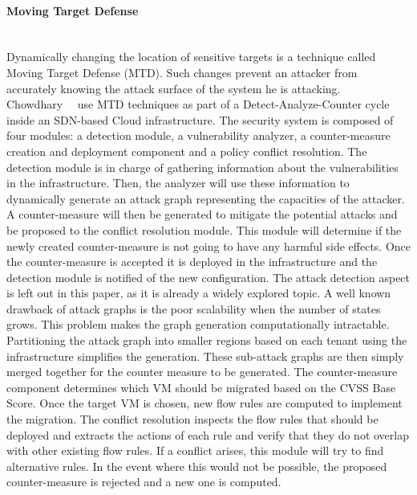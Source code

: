 \paragraph{Moving Target Defense}\textbf{\\}
Dynamically changing the location of sensitive targets is a technique called Moving Target Defense (MTD). Such changes prevent an attacker from accurately knowing the attack surface of the system he is attacking. 
Chowdhary~\etal~\cite{Chowdhary2016} use MTD techniques as part of a Detect-Analyze-Counter cycle inside an SDN-based Cloud infrastructure. 
The security system is composed of four modules: a detection module, a vulnerability analyzer, a counter-measure creation and deployment component and a policy conflict resolution.
The detection module is in charge of gathering information about the vulnerabilities in the infrastructure.
Then, the analyzer will use these information to dynamically generate an attack graph representing the capacities of the attacker. 
A counter-measure will then be generated to mitigate the potential attacks and be proposed to the conflict resolution module. This module  will determine if the newly created counter-measure is not going to have any harmful side effects. Once the counter-measure is accepted it is deployed in the infrastructure and the detection module is notified of the new configuration. 
The attack detection aspect is left out in this paper, as it is already a widely explored topic.
A well known drawback of attack graphs is the poor scalability when the number of states grows.
This problem makes the graph generation computationally intractable. Partitioning the attack graph into smaller regions based on each tenant using the infrastructure simplifies the generation.
These sub-attack graphs are then simply merged together for the counter measure to be generated.
The counter-measure component determines which VM should be migrated based on the CVSS Base Score.
Once the target VM is chosen, new flow rules are computed to implement the migration. 
The conflict resolution inspects the flow rules that should be deployed and extracts the actions of each rule and verify that they do not overlap with other existing flow rules. If a conflict arises, this module will try to find alternative rules. In the event where this would not be possible, the proposed counter-measure is rejected and a new one is computed.

